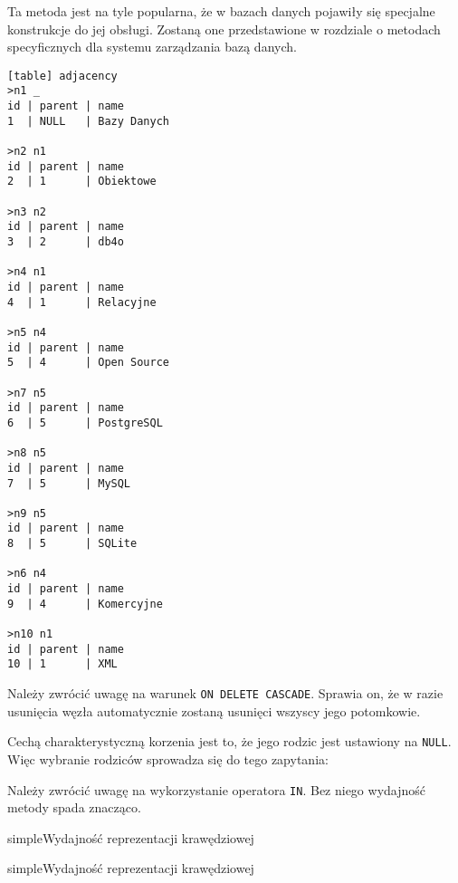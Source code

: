 Ta metoda jest na tyle popularna, że w bazach danych pojawiły się specjalne konstrukcje do jej obsługi. 
Zostaną one przedstawione w rozdziale  o metodach specyficznych dla systemu zarządzania bazą danych.



\begin{verbatim}[table] adjacency
>n1 _
id | parent | name
1  | NULL   | Bazy Danych

>n2 n1
id | parent | name
2  | 1      | Obiektowe

>n3 n2
id | parent | name
3  | 2      | db4o

>n4 n1
id | parent | name
4  | 1      | Relacyjne

>n5 n4
id | parent | name
5  | 4      | Open Source

>n7 n5
id | parent | name
6  | 5      | PostgreSQL

>n8 n5
id | parent | name
7  | 5      | MySQL

>n9 n5
id | parent | name
8  | 5      | SQLite

>n6 n4
id | parent | name
9  | 4      | Komercyjne

>n10 n1
id | parent | name
10 | 1      | XML

\end{verbatim}


\vspace{-0.5cm}

\vspace{-0.5cm}

Należy zwrócić uwagę na warunek \texttt{ON DELETE CASCADE}. 
Sprawia on, że w razie usunięcia węzła  
automatycznie zostaną usunięci wszyscy jego potomkowie.



Cechą charakterystyczną korzenia jest to, że jego rodzic jest ustawiony na \texttt{NULL}. Więc wybranie rodziców sprowadza się do tego zapytania:





Należy zwrócić uwagę na wykorzystanie operatora \texttt{IN}. Bez niego wydajność metody spada znacząco. 


\begin{qxtab}{simple}{Wydajność reprezentacji krawędziowej}
\end{qxtab}

\begin{qxfig}{simple}{Wydajność reprezentacji krawędziowej}
\end{qxfig}

